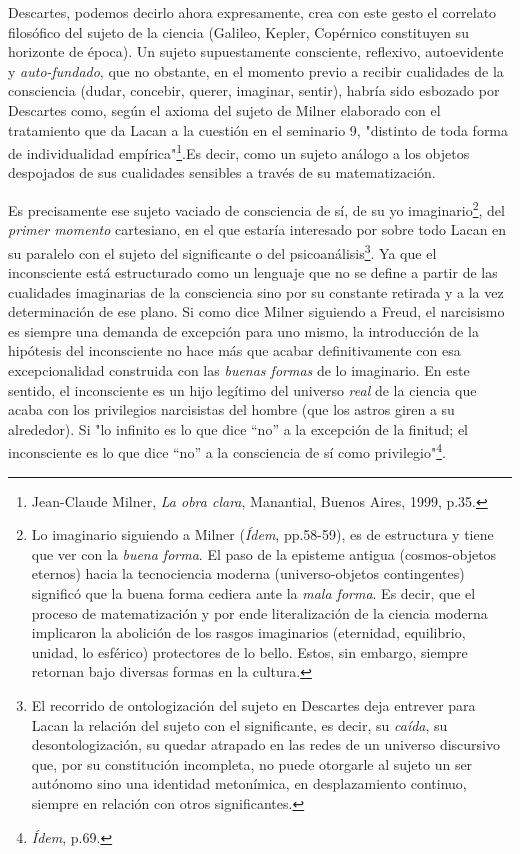 Descartes, podemos decirlo ahora expresamente, crea con este gesto el
correlato filosófico del sujeto de la ciencia (Galileo, Kepler,
Copérnico constituyen su horizonte de época). Un sujeto supuestamente
consciente, reflexivo, autoevidente y \emph{auto-fundado}, que no
obstante, en el momento previo a recibir cualidades de la consciencia
(dudar, concebir, querer, imaginar, sentir), habría sido esbozado por
Descartes como, según el axioma del sujeto de Milner elaborado con el
tratamiento que da Lacan a la cuestión en el seminario 9, "distinto de
toda forma de individualidad empírica"\footnote{Jean-Claude Milner,
  \emph{La obra clara}, Manantial, Buenos Aires, 1999, p.35.}.Es decir,
como un sujeto análogo a los objetos despojados de sus cualidades
sensibles a través de su matematización.

Es precisamente ese sujeto vaciado de consciencia de sí, de su yo
imaginario\footnote{Lo imaginario siguiendo a Milner (\emph{Ídem},
  pp.58-59), es de estructura y tiene que ver con la \emph{buena forma}.
  El paso de la episteme antigua (cosmos-objetos eternos) hacia la
  tecnociencia moderna (universo-objetos contingentes) significó que la
  buena forma cediera ante la \emph{mala forma}. Es decir, que el
  proceso de matematización y por ende literalización de la ciencia
  moderna implicaron la abolición de los rasgos imaginarios (eternidad,
  equilibrio, unidad, lo esférico) protectores de lo bello. Estos, sin
  embargo, siempre retornan bajo diversas formas en la cultura.}, del
\emph{primer momento} cartesiano, en el que estaría interesado por sobre
todo Lacan en su paralelo con el sujeto del significante o del
psicoanálisis\footnote{El recorrido de ontologización del sujeto en
  Descartes deja entrever para Lacan la relación del sujeto con el
  significante, es decir, su \emph{caída}, su desontologización, su
  quedar atrapado en las redes de un universo discursivo que, por su
  constitución incompleta, no puede otorgarle al sujeto un ser autónomo
  sino una identidad metonímica, en desplazamiento continuo, siempre en
  relación con otros significantes.}. Ya que el inconsciente está
estructurado como un lenguaje que no se define a partir de las
cualidades imaginarias de la consciencia sino por su constante retirada
y a la vez determinación de ese plano. Si como dice Milner siguiendo a
Freud, el narcisismo es siempre una demanda de excepción para uno mismo,
la introducción de la hipótesis del inconsciente no hace más que acabar
definitivamente con esa excepcionalidad construida con las \emph{buenas
formas} de lo imaginario. En este sentido, el inconsciente es un hijo
legítimo del universo \emph{real} de la ciencia que acaba con los
privilegios narcisistas del hombre (que los astros giren a su
alrededor). Si "lo infinito es lo que dice ``no'' a la excepción de la
finitud; el inconsciente es lo que dice ``no'' a la consciencia de sí
como privilegio"\footnote{\emph{Ídem}, p.69.}.

